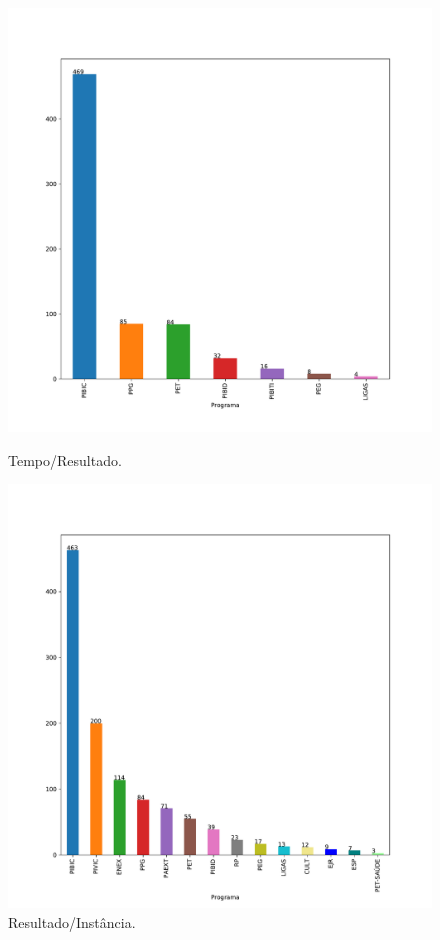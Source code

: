 \documentclass[a4paper, 12pt]{article}
\begin{document}
\begin{figure}[!htb]
    \centering
    \begin{minipage}{0.5\textwidth}
        \centering
        \includegraphics[width=1\textwidth]{../Resultados/img/programa_bar_2018.pdf}
        \caption{Tempo/Resultado.}
        \label{fig:scatter_topDown}
    \end{minipage}%
    \begin{minipage}{0.5\textwidth}
        \centering
        \includegraphics[width=1\textwidth]{../Resultados/img/programa_bar_2019.pdf}
        \caption{Resultado/Instância.}
        \label{fig:result_topDown}
    \end{minipage}
\end{figure}
\clearpage
\end{document}
